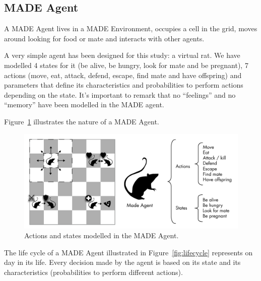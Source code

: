 \documentclass[runningheads]{llncs}
\begin{document}


\subsection{MADE Agent}
A MADE Agent lives in a MADE Environment, occupies a cell in the grid, moves around looking for food or mate and interacts with other agents.

A very simple agent has been designed for this study: a virtual rat. We have modelled 4 states for it (be alive, be hungry, look for mate and be pregnant), 7 actions (move, eat, attack, defend, escape, find mate and have offspring) and parameters that define its characteristics and probabilities to perform actions depending on the state. It's important to remark that no ``feelings'' and no ``memory'' have been modelled in the MADE agent.

Figure~\ref{fig:madeAgent} illustrates the nature of a MADE Agent.

\begin{figure}
\begin{center}
\includegraphics[scale=0.65]{img/MadeAgent.pdf}
\caption{Actions and states modelled in the MADE Agent.}
\label{fig:madeAgent}
\end{center}
\end{figure}

The life cycle of a MADE Agent illustrated in Figure~\ref{fig:lifecycle} represents on day in its life. Every decision made by the agent is based on its state and its characteristics (probabilities to perform different actions).
\end{document}
